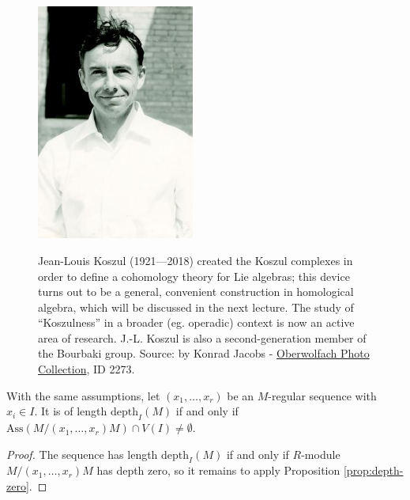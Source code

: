 \begin{figure}[h]
	\centering \vspace{1em} \includegraphics[height=220pt]{Jean-Louis_Koszul.jpg} \\ \vspace{1em}
	\begin{minipage}{0.7\textwidth}
		\small Jean-Louis Koszul (1921---2018) created the Koszul complexes in order to define a cohomology theory for Lie algebras; this device turns out to be a general, convenient construction in homological algebra, which will be discussed in the next lecture. The study of ``Koszulness'' in a broader (eg. operadic) context is now an active area of research. J.-L. Koszul is also a second-generation member of the Bourbaki group. Source: by Konrad Jacobs - \href{http://owpdb.mfo.de/detail?photo_id=2273}{Oberwolfach Photo Collection}, ID 2273.
	\end{minipage}
\end{figure}

\begin{corollary}
	With the same assumptions, let $(x_1, \ldots, x_r)$ be an $M$-regular sequence with $x_i \in I$. It is of length $\mathrm{depth}_I(M)$ if and only if $\mathrm{Ass}(M/(x_1, \ldots, x_r)M) \cap V(I) \neq \emptyset$.
\end{corollary}
\begin{proof}
	The sequence has length $\text{depth}_I(M)$ if and only if $R$-module $M/(x_1, \ldots, x_r)M$ has depth zero, so it remains to apply Proposition \ref{prop:depth-zero}.
\end{proof}

